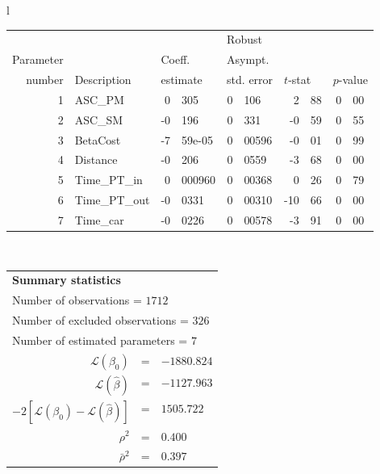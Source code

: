   \begin{tabular}{l}
\begin{tabular}{rlr@{.}lr@{.}lr@{.}lr@{.}l}
         &                       &   \multicolumn{2}{l}{}    & \multicolumn{2}{l}{Robust}  &     \multicolumn{4}{l}{}   \\
Parameter &                       &   \multicolumn{2}{l}{Coeff.}      & \multicolumn{2}{l}{Asympt.}  &     \multicolumn{4}{l}{}   \\
number &  Description                     &   \multicolumn{2}{l}{estimate}      & \multicolumn{2}{l}{std. error}  &   \multicolumn{2}{l}{$t$-stat}  &   \multicolumn{2}{l}{$p$-value}   \\

\hline

1 & ASC_PM  & 0&305 & 0&106 & 2&88 & 0&00\\
2 & ASC_SM & -0&196 & 0&331 & -0&59 & 0&55\\
3 & BetaCost & -7&59e-05 & 0&00596 & -0&01 & 0&99\\
4 & Distance & -0&206 & 0&0559 & -3&68 & 0&00\\
5 & Time_PT_in & 0&000960 & 0&00368 & 0&26 & 0&79\\
6 & Time_PT_out & -0&0331 & 0&00310 & -10&66 & 0&00\\
7 & Time_car & -0&0226 & 0&00578 & -3&91 & 0&00\\
\hline
\end{tabular}
\\
\begin{tabular}{rcl}
\multicolumn{3}{l}{\bf Summary statistics}\\
\multicolumn{3}{l}{ Number of observations = $1712$} \\
\multicolumn{3}{l}{ Number of excluded observations = $326$} \\
\multicolumn{3}{l}{ Number of estimated  parameters = $7$} \\
 $\mathcal{L}(\beta_0)$ &=&  $-1880.824$ \\
 $\mathcal{L}(\hat{\beta})$ &=& $-1127.963 $  \\
 $-2[\mathcal{L}(\beta_0) -\mathcal{L}(\hat{\beta})]$ &=& $1505.722$ \\
    $\rho^2$ &=&   $0.400$ \\
    $\bar{\rho}^2$ &=&    $0.397$ \\
\end{tabular}
  \end{tabular}
